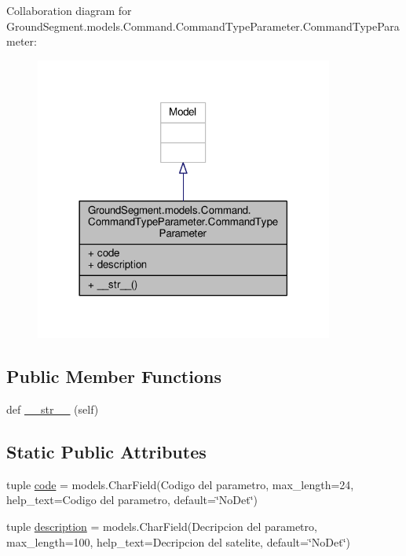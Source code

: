 Collaboration diagram for Ground\+Segment.\+models.\+Command.\+Command\+Type\+Parameter.\+Command\+Type\+Parameter\+:\nopagebreak
\begin{figure}[H]
\begin{center}
\leavevmode
\includegraphics[width=278pt]{class_ground_segment_1_1models_1_1_command_1_1_command_type_parameter_1_1_command_type_parameter__coll__graph}
\end{center}
\end{figure}
\subsection*{Public Member Functions}
\begin{DoxyCompactItemize}
\item 
def \hyperlink{class_ground_segment_1_1models_1_1_command_1_1_command_type_parameter_1_1_command_type_parameter_acb76fa3792afc33ae665225e3099e025}{\+\_\+\+\_\+str\+\_\+\+\_\+} (self)
\end{DoxyCompactItemize}
\subsection*{Static Public Attributes}
\begin{DoxyCompactItemize}
\item 
tuple \hyperlink{class_ground_segment_1_1models_1_1_command_1_1_command_type_parameter_1_1_command_type_parameter_a35d22bc7ba5de08aae11d2badbe4273a}{code} = models.\+Char\+Field(\textquotesingle{}Codigo del parametro\textquotesingle{}, max\+\_\+length=24, help\+\_\+text=\textquotesingle{}Codigo del parametro\textquotesingle{}, default=\char`\"{}No\+Det\char`\"{})
\item 
tuple \hyperlink{class_ground_segment_1_1models_1_1_command_1_1_command_type_parameter_1_1_command_type_parameter_af58adf2c5f3eeee9bb86b6215ebfc5d6}{description} = models.\+Char\+Field(\textquotesingle{}Decripcion del parametro\textquotesingle{}, max\+\_\+length=100, help\+\_\+text=\textquotesingle{}Decripcion del satelite\textquotesingle{}, default=\char`\"{}No\+Det\char`\"{})
\end{DoxyCompactItemize}


